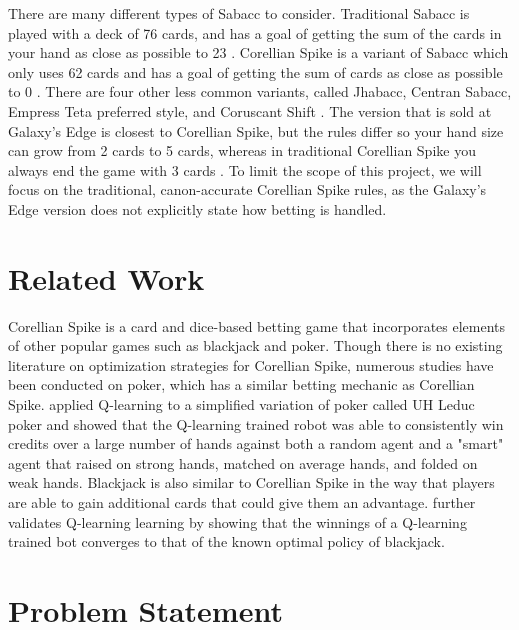 \documentclass{article}
\begin{document}
There are many different types of Sabacc to consider. Traditional Sabacc is played with a deck of 76 cards, and has a goal of getting the sum of the cards in your hand as close as possible to 23 \cite{sabacc}. Corellian Spike is a variant of Sabacc which only uses 62 cards and has a goal of getting the sum of cards as close as possible to 0 \cite{spike}. There are four other less common variants, called Jhabacc, Centran Sabacc, Empress Teta preferred style, and Coruscant Shift \cite{sabacc}. The version that is sold at Galaxy's Edge is closest to Corellian Spike, but the rules differ so your hand size can grow from 2 cards to 5 cards, whereas in traditional Corellian Spike you always end the game with 3 cards \cite{spike}. To limit the scope of this project, we will focus on the traditional, canon-accurate Corellian Spike rules, as the Galaxy's Edge version does not explicitly state how betting is handled.

\section{Related Work} %
Corellian Spike is a card and dice-based betting game that incorporates elements of other popular games such as blackjack and poker. Though there is no existing literature on optimization strategies for Corellian Spike, numerous studies have been conducted on poker, which has a similar betting mechanic as Corellian Spike. \cite{RW_thesis} applied Q-learning to a simplified variation of poker called UH Leduc poker and showed that the Q-learning trained robot was able to consistently win credits over a large number of hands against both a random agent and a "smart" agent that raised on strong hands, matched on average hands, and folded on weak hands. Blackjack is also similar to Corellian Spike in the way that players are able to gain additional cards that could give them an advantage. \cite{Granville} further validates Q-learning learning by showing that the winnings of a Q-learning trained bot converges to that of the known optimal policy of blackjack.

\section{Problem Statement}
\end{document}
